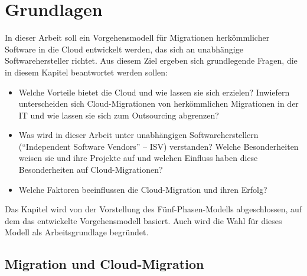 \section{Grundlagen}
\label{cha:grundlagen}

In dieser Arbeit soll ein Vorgehensmodell für Migrationen herkömmlicher 
Software in die Cloud entwickelt werden, das sich an unabhängige 
Softwarehersteller richtet. Aus diesem Ziel ergeben sich grundlegende Fragen, 
die in diesem Kapitel beantwortet werden sollen:
\begin{itemize}
	\item Welche Vorteile bietet die Cloud und wie lassen sie sich
erzielen? Inwiefern unterscheiden sich Cloud-Migrationen von herkömmlichen
Migrationen in der IT und wie lassen sie sich zum Outsourcing abgrenzen? 
	\item Was wird in dieser Arbeit unter unabhängigen 
Softwareherstellern ("`Independent Software Vendors"' -- ISV)  
verstanden? Welche Besonderheiten weisen sie und ihre Projekte auf und welchen
Einfluss haben diese Besonderheiten auf Cloud-Migrationen?
	\item Welche Faktoren beeinflussen die Cloud-Migration und ihren
Erfolg?
\end{itemize}
Das Kapitel wird von der Vorstellung des Fünf-Phasen-Modells abgeschlossen,
auf dem das entwickelte Vorgehensmodell basiert. Auch wird die Wahl für dieses
Modell als Arbeitsgrundlage begründet.

\subsection{Migration und Cloud-Migration}
\label{cha:definition_cloud-migration}


